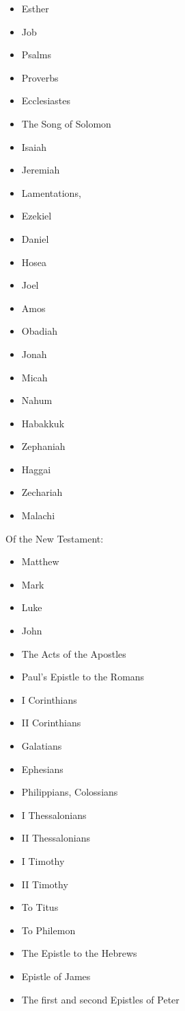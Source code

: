 \documentclass[12pt,a4paper]{book}
\begin{document}
\begin{enumerate}
\begin{itemize}
\item Esther
\item Job
\item Psalms
\item Proverbs
\item Ecclesiastes
\item The Song of Solomon
\item Isaiah
\item Jeremiah
\item Lamentations,
\item Ezekiel
\item Daniel
\item Hosea
\item Joel
\item Amos
\item Obadiah
\item Jonah
\item Micah
\item Nahum
\item Habakkuk
\item Zephaniah
\item Haggai
\item Zechariah
\item Malachi
\end{itemize}
Of the New Testament:
\begin{itemize}
\item Matthew
\item Mark
\item Luke
\item John
\item The Acts of the Apostles
\item Paul's Epistle to the Romans
\item I Corinthians
\item II Corinthians
\item Galatians
\item Ephesians
\item Philippians, Colossians
\item I Thessalonians
\item II Thessalonians
\item I Timothy
\item II Timothy
\item To Titus
\item To Philemon
\item The Epistle to the Hebrews
\item Epistle of James
\item The first and second Epistles of Peter

\end{itemize}
\end{enumerate}
\end{document}
